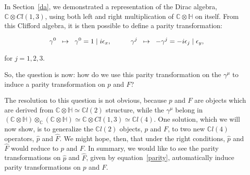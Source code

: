 \documentclass[letterpaper,12pt,titlepage,oneside,final]{book}
\newcommand{\C}{\mathbb{C}}
\newcommand{\CH}{\mathbb{C}\otimes\mathbb{H}}
\newcommand{\CLtwo}{\mathbb{C}l(2)}
\newcommand{\CLfour}{\mathbb{C}l(4)}
\begin{document}



In Section~\ref{da}, we demonstrated a representation of the Dirac algebra, $\C\otimes Cl(1,3)$, using both left and right multiplication of $\CH$ on itself.  From this Clifford algebra, it is then possible to define a parity transformation:

\begin{equation}\label{parity} \gamma^0\hspace{2mm}\mapsto\hspace{2mm}\gamma^0 = 1\hspace{1mm}|\hspace{1mm}i\epsilon_x,\hspace{1cm} \gamma^j\hspace{2mm}\mapsto\hspace{2mm}-\gamma^j = -i\epsilon_j \hspace{1mm}| \hspace{1mm}\epsilon_y,
\end{equation}

\noindent for $j = 1,2,3.$  

%
So, the question is now:  how do we use this parity transformation on the $\gamma^{\mu}$ to induce a parity transformation on $p$ and $F$?  

The resolution to this question is not obvious, because $p$ and $F$ are objects which are derived from $\CH\simeq\CLtwo$ structure, while the $\gamma^{\mu}$ belong in $\left(\CH\right)\otimes_{\C}\left(\CH\right)\simeq\C\otimes Cl(1,3) \simeq \CLfour$.  One solution, which we will now show, is to generalize the $\CLtwo$ objects, $p$ and $F$, to two new $\CLfour$ operators, $\hat{p}$ and $\hat{F}$.  We might hope, then, that under the right conditions, $\hat{p}$ and $\hat{F}$ would reduce to $p$ and $F$.   In summary, we would like to see the parity transformations on $\hat{p}$ and $\hat{F}$, given by equation~\ref{parity}, automatically induce parity transformations on $p$ and $F$.
\end{document}
